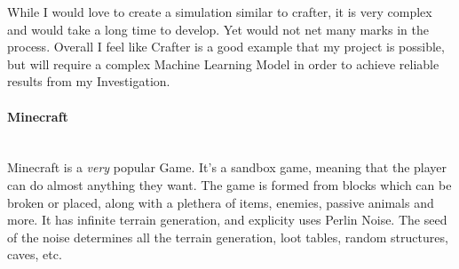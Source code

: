 \begin{flushleft}
                        \begin{figure}[h]
                            \centering
                            \qquad
                        \end{figure}

                        While I would love to create a simulation similar to crafter, it is very complex and would take a long time to develop. Yet
                        would not net many marks in the process. Overall I feel like Crafter is a good example that my project is possible, but will
                        require a complex Machine Learning Model in order to achieve reliable results from my Investigation.

                \paragraph{Minecraft} \mbox{} \\
                    \vspace{0.2cm}
                    Minecraft is a \textit{very} popular Game. It's a sandbox game, meaning that the player can do almost anything they want.
                    The game is formed from blocks which can be broken or placed, along with a plethera of items, enemies, passive animals
                    and more. It has infinite terrain generation, and explicity uses Perlin Noise. The seed of the noise determines
                    all the terrain generation, loot tables, random structures, caves, etc. \\
                    

\end{flushleft}
